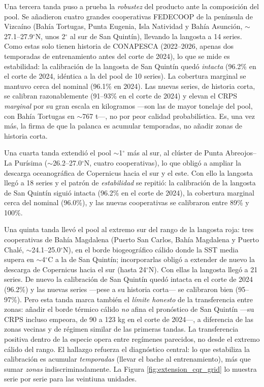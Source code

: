 \documentclass[twoside,11pt]{article}
\begin{document}
Una tercera tanda puso a prueba la \emph{robustez} del producto ante la composición del pool. Se añadieron cuatro grandes cooperativas FEDECOOP de la península de Vizcaíno (Bahía Tortugas, Punta Eugenia, Isla Natividad y Bahía Asunción, $\sim$27.1--27.9$^\circ$N, unos 2$^\circ$ al sur de San Quintín), llevando la langosta a 14 series. Como estas solo tienen historia de CONAPESCA (2022--2026, apenas dos temporadas de entrenamiento antes del corte de 2024), lo que se mide es estabilidad: la calibración de la langosta de San Quintín quedó \emph{intacta} (96.2\% en el corte de 2024, idéntica a la del pool de 10 series). La cobertura marginal se mantuvo cerca del nominal (96.1\% en 2024). Las nuevas series, de historia corta, se calibran razonablemente (91--93\% en el corte de 2024) y elevan el CRPS \emph{marginal} por su gran escala en kilogramos ---son las de mayor tonelaje del pool, con Bahía Tortugas en $\sim$767 t---, no por peor calidad probabilística. Es, una vez más, la firma de que la palanca es acumular temporadas, no añadir zonas de historia corta.

Una cuarta tanda extendió el pool $\sim$1$^\circ$ más al sur, al clúster de Punta Abreojos--La Purísima ($\sim$26.2--27.0$^\circ$N, cuatro cooperativas), lo que obligó a ampliar la descarga oceanográfica de Copernicus hacia el sur y el este. Con ello la langosta llegó a 18 series y el patrón de \emph{estabilidad} se repitió: la calibración de la langosta de San Quintín siguió intacta (96.2\% en el corte de 2024), la cobertura marginal cerca del nominal (96.0\%), y las nuevas cooperativas se calibraron entre 89\% y 100\%.

Una quinta tanda llevó el pool al extremo sur del rango de la langosta roja: tres cooperativas de Bahía Magdalena (Puerto San Carlos, Bahía Magdalena y Puerto Chalé, $\sim$24.1--25.0$^\circ$N), en el borde biogeográfico cálido donde la SST media supera en $\sim$4$^\circ$C a la de San Quintín; incorporarlas obligó a extender de nuevo la descarga de Copernicus hacia el sur (hasta 24$^\circ$N). Con ellas la langosta llegó a 21 series. De nuevo la calibración de San Quintín quedó intacta en el corte de 2024 (96.2\%) y las nuevas series ---pese a su historia corta--- se calibraron bien (95--97\%). Pero esta tanda marca también el \emph{límite honesto} de la transferencia entre zonas: añadir el borde térmico cálido \emph{no} afina el pronóstico de San Quintín ---su CRPS incluso empeora, de 90 a 123 kg en el corte de 2024---, a diferencia de las zonas vecinas y de régimen similar de las primeras tandas. La transferencia positiva dentro de la especie opera entre regímenes parecidos, no desde el extremo cálido del rango. El hallazgo refuerza el diagnóstico central: lo que estabiliza la calibración es acumular \emph{temporadas} (llevar el bache al entrenamiento), más que sumar \emph{zonas} indiscriminadamente. La Figura \ref{fig:extension_cqr_grid} lo muestra serie por serie para las veintiuna unidades.
\end{document}
